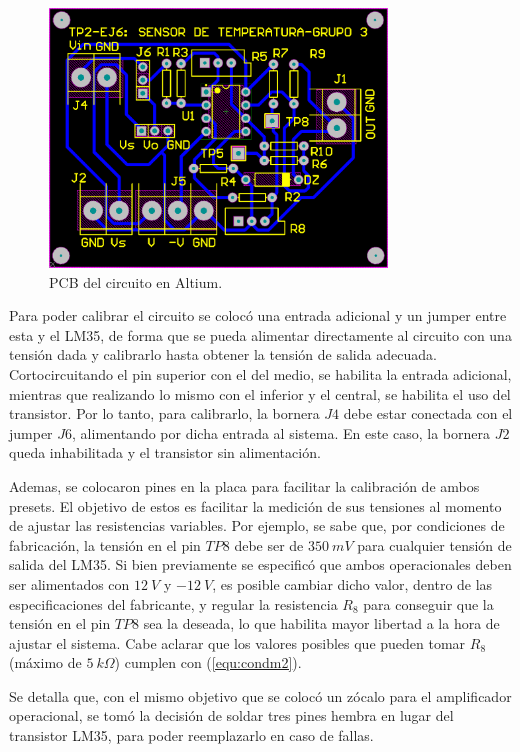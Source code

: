 \documentclass[a4paper]{article}
\begin{document}
\begin{figure}[H]
	\centering
	\includegraphics[width=0.8\textwidth]{Ejercicio6/Imagenes/PCB.png}
	\caption{PCB del circuito en Altium.}
	\label{fig:PCB}
\end{figure}

Para poder calibrar el circuito se colocó una entrada adicional y un jumper entre esta y el LM35, de forma que se pueda alimentar directamente al circuito con una tensión dada y calibrarlo hasta obtener la tensión de salida adecuada. Cortocircuitando el pin superior con el del medio, se habilita la entrada adicional, mientras que realizando lo mismo con el inferior y el central, se habilita el uso del transistor. Por lo tanto, para calibrarlo, la bornera $J4$ debe estar conectada con el jumper $J6$, alimentando por dicha entrada al sistema. En este caso, la bornera $J2$ queda inhabilitada y el transistor sin alimentación.

Ademas, se colocaron pines en la placa para facilitar la calibración de ambos presets. El objetivo de estos es facilitar la medición de sus tensiones al momento de ajustar las resistencias variables. Por ejemplo, se sabe que, por condiciones de fabricación, la tensión en el pin $TP8$ debe ser de $350 \ mV$ para cualquier tensión de salida del LM35. Si bien previamente se especificó que ambos operacionales deben ser alimentados con $12 \ V$ y $-12 \ V$, es posible cambiar dicho valor, dentro de las especificaciones del fabricante, y regular la resistencia $R_8$ para conseguir que la tensión en el pin $TP8$ sea la deseada, lo que habilita mayor libertad a la hora de ajustar el sistema. Cabe aclarar que los valores posibles que pueden tomar $R_8$ (máximo de $5 \ k\Omega$) cumplen con (\ref{equ:condm2}).

Se detalla que, con el mismo objetivo que se colocó un zócalo para el amplificador operacional, se tomó la decisión de soldar tres pines hembra en lugar del transistor LM35, para poder reemplazarlo en caso de fallas.
\end{document}
